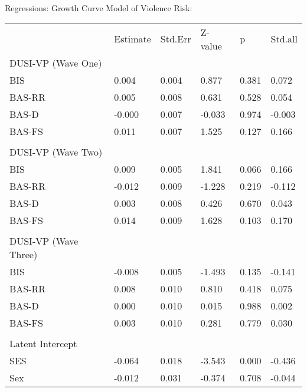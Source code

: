 \documentclass[utf8]{frontiersSCNS} %
\begin{document}
Regressions: Growth Curve Model of Violence Risk:
\begin{table}[]
\begin{tabular}{llllll}
                     & Estimate & Std.Err & Z-value & p     & Std.all \\
DUSI-VP (Wave One)   &          &         &         &       &         \\
BIS                  & 0.004    & 0.004   & 0.877   & 0.381 & 0.072   \\
BAS-RR               & 0.005    & 0.008   & 0.631   & 0.528 & 0.054   \\
BAS-D                & -0.000   & 0.007   & -0.033  & 0.974 & -0.003  \\
BAS-FS               & 0.011    & 0.007   & 1.525   & 0.127 & 0.166   \\
                     &          &         &         &       &         \\
DUSI-VP (Wave Two)   &          &         &         &       &         \\
BIS                  & 0.009    & 0.005   & 1.841   & 0.066 & 0.166   \\
BAS-RR               & -0.012   & 0.009   & -1.228  & 0.219 & -0.112  \\
BAS-D                & 0.003    & 0.008   & 0.426   & 0.670 & 0.043   \\
BAS-FS               & 0.014    & 0.009   & 1.628   & 0.103 & 0.170   \\
                     &          &         &         &       &         \\
DUSI-VP (Wave Three) &          &         &         &       &         \\
BIS                  & -0.008   & 0.005   & -1.493  & 0.135 & -0.141  \\
BAS-RR               & 0.008    & 0.010   & 0.810   & 0.418 & 0.075   \\
BAS-D                & 0.000    & 0.010   & 0.015   & 0.988 & 0.002   \\
BAS-FS               & 0.003    & 0.010   & 0.281   & 0.779 & 0.030   \\
                     &          &         &         &       &         \\
Latent Intercept     &          &         &         &       &         \\
SES                  & -0.064   & 0.018   & -3.543  & 0.000 & -0.436  \\
Sex                  & -0.012   & 0.031   & -0.374  & 0.708 & -0.044  \\

\end{tabular}
\end{table}
\end{document}

